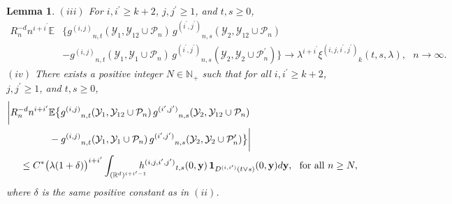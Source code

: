 \documentclass[11pt]{amsart}
\numberwithin{equation}{section}
\theoremstyle{plain}
\newtheorem{lemma}[theorem]{Lemma}
\theoremstyle{definition}
\begin{document}
\begin{lemma}
\noindent $(iii)$ For $i, {i^{\prime}} \geq k+2$, $j,{j^{\prime}} \geq 1$, and $t,s\geq 0$,
\begin{align*}
R_n^{-d} n^{i+{i^{\prime}}} {\mathbb{E}} &\bigl\{  {g^{(i,j)}}_{n,t}({{\mathcal{Y}}}_1, {{\mathcal{Y}}}_{12} \cup {\mathcal P_n})\, {g^{(i^{\prime},j^{\prime})}}_{n,s}({{\mathcal{Y}}}_2, {{\mathcal{Y}}}_{12} \cup {\mathcal P_n}) \\
&- {g^{(i,j)}}_{n,t}({{\mathcal{Y}}}_1, {{\mathcal{Y}}}_1 \cup {\mathcal P_n})\, {g^{(i^{\prime},j^{\prime})}}_{n,s} ({{\mathcal{Y}}}_2, {{\mathcal{Y}}}_2 \cup {\mathcal P_n^{\prime}})\bigr\} \to \lambda^{i+{i^{\prime}}} {\xi^{(i,j,{i^{\prime}},{j^{\prime}})}}_k(t,s,\lambda), \ \ \ n\to\infty.
\end{align*}
\noindent $(iv)$ There exists a positive integer $N \in {{\mathbb N}}_+$ such that for all $i, {i^{\prime}} \geq k+2$, $j, {j^{\prime}} \geq 1$, and $t,s \geq 0$,
\begin{align*}
\biggl| &R_n^{-d} n^{i+{i^{\prime}}} {\mathbb{E}} \bigl\{  {g^{(i,j)}}_{n,t}({{\mathcal{Y}}}_1, {{\mathcal{Y}}}_{12} \cup {\mathcal P_n})\, {g^{(i^{\prime},j^{\prime})}}_{n,s}({{\mathcal{Y}}}_2, {{\mathcal{Y}}}_{12} \cup {\mathcal P_n}) \\
&\qquad \qquad - {g^{(i,j)}}_{n,t}({{\mathcal{Y}}}_1, {{\mathcal{Y}}}_1 \cup {\mathcal P_n})\, {g^{(i^{\prime},j^{\prime})}}_{n,s} ({{\mathcal{Y}}}_2, {{\mathcal{Y}}}_2 \cup {\mathcal P_n^{\prime}}) \bigr\}  \biggr| \\
&\quad \leq C^* \bigl( \lambda (1+\delta) \bigr)^{i+{i^{\prime}}}\int_{({{\mathbb R}}^d)^{i+{i^{\prime}}-1}} \hspace{-10pt} {h^{(i, j, i^{\prime}, j^{\prime})}}_{t,s} (0,{{\bf y}})\,{{\bf 1}}_{{D^{(i,{i^{\prime}})}}(t\vee s)}(0,{{\bf y}})d{{\bf y}}, \ \ \text{for all } n \geq N,
\end{align*}
where $\delta$ is the same positive constant as in $(ii)$.
\end{lemma}
\end{document}

